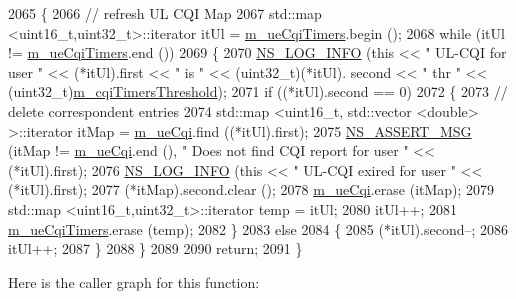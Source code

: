 \begin{DoxyCode}
2065 \{
2066   \textcolor{comment}{// refresh UL CQI  Map}
2067   std::map <uint16\_t,uint32\_t>::iterator itUl = \hyperlink{classns3_1_1FdBetFfMacScheduler_ae6bef84c07e9ff1f50541f7f286114c6}{m\_ueCqiTimers}.begin ();
2068   \textcolor{keywordflow}{while} (itUl != \hyperlink{classns3_1_1FdBetFfMacScheduler_ae6bef84c07e9ff1f50541f7f286114c6}{m\_ueCqiTimers}.end ())
2069     \{
2070       \hyperlink{group__logging_gafbd73ee2cf9f26b319f49086d8e860fb}{NS\_LOG\_INFO} (\textcolor{keyword}{this} << \textcolor{stringliteral}{" UL-CQI for user "} << (*itUl).first << \textcolor{stringliteral}{" is "} << (uint32\_t)(*itUl).
      second << \textcolor{stringliteral}{" thr "} << (uint32\_t)\hyperlink{classns3_1_1FdBetFfMacScheduler_ad25e8d5207cfa78201a9af0d38aab817}{m\_cqiTimersThreshold});
2071       \textcolor{keywordflow}{if} ((*itUl).second == 0)
2072         \{
2073           \textcolor{comment}{// delete correspondent entries}
2074           std::map <uint16\_t, std::vector <double> >::iterator itMap = \hyperlink{classns3_1_1FdBetFfMacScheduler_a8cb7a6ccbbc1ee0a6dd2872cdc9d131e}{m\_ueCqi}.find ((*itUl).first);
2075           \hyperlink{assert_8h_aff5ece9066c74e681e74999856f08539}{NS\_ASSERT\_MSG} (itMap != \hyperlink{classns3_1_1FdBetFfMacScheduler_a8cb7a6ccbbc1ee0a6dd2872cdc9d131e}{m\_ueCqi}.end (), \textcolor{stringliteral}{" Does not find CQI report for user "}
       << (*itUl).first);
2076           \hyperlink{group__logging_gafbd73ee2cf9f26b319f49086d8e860fb}{NS\_LOG\_INFO} (\textcolor{keyword}{this} << \textcolor{stringliteral}{" UL-CQI exired for user "} << (*itUl).first);
2077           (*itMap).second.clear ();
2078           \hyperlink{classns3_1_1FdBetFfMacScheduler_a8cb7a6ccbbc1ee0a6dd2872cdc9d131e}{m\_ueCqi}.erase (itMap);
2079           std::map <uint16\_t,uint32\_t>::iterator temp = itUl;
2080           itUl++;
2081           \hyperlink{classns3_1_1FdBetFfMacScheduler_ae6bef84c07e9ff1f50541f7f286114c6}{m\_ueCqiTimers}.erase (temp);
2082         \}
2083       \textcolor{keywordflow}{else}
2084         \{
2085           (*itUl).second--;
2086           itUl++;
2087         \}
2088     \}
2089 
2090   \textcolor{keywordflow}{return};
2091 \}
\end{DoxyCode}


Here is the caller graph for this function\+:


